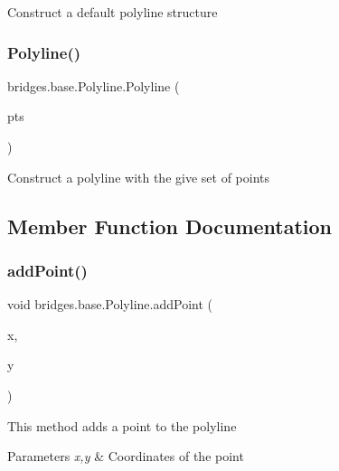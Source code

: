Construct a default polyline structure \mbox{\label{classbridges_1_1base_1_1_polyline_a11d14fddddd6e89e0902e94aa1bac875}} 
\subsubsection{\texorpdfstring{Polyline()}{Polyline()}\hspace{0.1cm}{\footnotesize\ttfamily [2/2]}}
{\footnotesize\ttfamily bridges.\+base.\+Polyline.\+Polyline (\begin{DoxyParamCaption}\item[{Array\+List$<$ Float $>$}]{pts }\end{DoxyParamCaption})}

Construct a polyline with the give set of points 

\subsection{Member Function Documentation}
\mbox{\label{classbridges_1_1base_1_1_polyline_a24b99307181f1a938ea408355984d191}} 
\subsubsection{\texorpdfstring{addPoint()}{addPoint()}}
{\footnotesize\ttfamily void bridges.\+base.\+Polyline.\+add\+Point (\begin{DoxyParamCaption}\item[{float}]{x,  }\item[{float}]{y }\end{DoxyParamCaption})}

This method adds a point to the polyline


\begin{DoxyParams}{Parameters}
{\em x,y} & Coordinates of the point \\
\hline
\end{DoxyParams}
\mbox{\label{classbridges_1_1base_1_1_polyline_a5665bd906b841ca71a668581aeb7a181}} 

